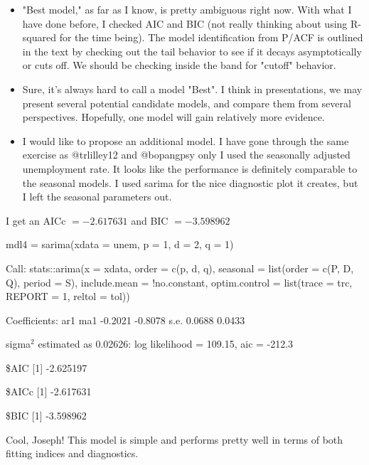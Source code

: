 {\begin{itemize}
\item "Best model," as far as I know, is pretty ambiguous right now. With what I have done before, I checked AIC and BIC (not really thinking about using R-squared for the time being). The model identification from P/ACF is outlined in the text by checking out the tail behavior to see if it decays asymptotically or cuts off. We should be checking inside the band for "cutoff" behavior.

\item Sure, it's always hard to call a model "Best". I think in presentations, we may present several potential candidate models, and compare them from several perspectives. Hopefully, one model will gain relatively more evidence.

\item I would like to propose an additional model. I have gone through the same exercise as @trlilley12 and @bopangpsy only I used the seasonally adjusted unemployment rate. It looks like the performance is definitely comparable to the seasonal models. I used sarima for the nice diagnostic plot it creates, but I left the seasonal parameters out.

\end{itemize}

I get an AICc \(= -2.617631\) and BIC \(= -3.598962\)


mdl4 = sarima(xdata = unem, p = 1, d = 2, q = 1)

Call:
stats::arima(x = xdata, order = c(p, d, q), seasonal = list(order = c(P, D, 
Q), period = S), include.mean = !no.constant, optim.control = list(trace = trc, 
REPORT = 1, reltol = tol))

Coefficients:
ar1      ma1
-0.2021  -0.8078
s.e.   0.0688   0.0433

sigma\(^2\) estimated as 0.02626:  log likelihood = 109.15,  aic = -212.3

\$AIC
[1] -2.625197

\$AICc
[1] -2.617631

\$BIC
[1] -3.598962


Cool, Joseph! This model is simple and performs pretty well in terms of both fitting indices and diagnostics.

\begin{flushleft}
\end{flushleft}
}
  

